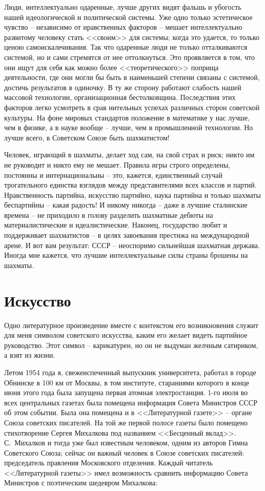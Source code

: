 \documentclass{book}
\begin{document}
Люди, интеллектуально одаренные, лучше других видят фальшь и убогость нашей идеологической и политической системы. Уже одно 
только эстетическое чувство -- независимо от нравственных факторов -- мешает интеллектуально развитому человеку стать <<своим>> 
для системы; когда это удается, то только ценою самоискалечивания. Так что одаренные люди не только отталкиваются системой, но и 
сами стремятся от нее оттолкнуться. Это проявляется в том, что они ищут для себя как можно более <<теоретического>> поприща 
деятельности, где они могли бы быть в наименьшей степени связаны с систе­мой, достичь результатов в одиночку. В ту же сторону 
работают слабость нашей массовой технологии, организационная бестолковщина. Последствия этих факторов легко усмотреть в срав­
нительных успехах различных сторон советской культуры. На фоне мировых стандартов положение в математике у нас лучше, чем в 
физике, а в науке вообще -- лучше, чем в промыш­ленной технологии. Но лучше всего, в Советском Союзе быть шахматистом!

Человек, играющий в шахматы, делает ход сам,  на свой страх и риск; никто им не руководит и никто ему не мешает. Правила игры 
строго определены, постоянны и интернациональны --  это, кажется, единственный случай трогательного единства взглядов между 
представителями всех классов и партий. Нравственность партийна, искусство партийно, наука партийна и только шахматы беспартийны 
-- какая радость! И никому никогда -- даже в лучшие сталинские времена -- не приходило в голову разделить шахматные дебюты на 
материалистические и идеалистические. Наконец, государство любит и поддерживает шахматистов -- в целях завоевания престижа на 
международной арене. И вот вам результат: СССР -- неоспоримо сильнейшая шахматная держава.
Иногда мне кажется, что лучшие интеллектуальные силы страны брошены на шахматы.


\section{Искусство}

Одно литературное произведение вместе с контекстом его возникновения служит для меня символом советского искусства, каким его 
желает видеть партийное руководство. Этот символ -- карикатурен, но он не выдуман желчным сатириком, а взят из жизни.

Летом 1954 года я, свежеиспеченный выпускник университета, работал в городе Обнинске в 100 км от Москвы, в том институте, 
стараниями которого в конце июня этого года была запущена первая атомная электростанция. 1-го июля во всех центральных газетах 
была помещена информация Совета Министров СССР об этом событии. Была она помещена и в <<Литературной газете>> -- органе Союза 
советских писателей. На той же первой полосе газеты было помещено стихотворение Сер­гея Михалкова под названием <<Бесценный 
вклад>>. С.~Михалков и тогда уже был известным человеком, одним из авторов Гимна Советского Союза; сейчас он важный человек в 
Союзе советских писателей: председатель правления Московского отделения. Каждый читатель <<Литературной газеты>> имел возможность сравнить информацию Совета Министров с поэтическим шедевром Михалкова:
\end{document}
